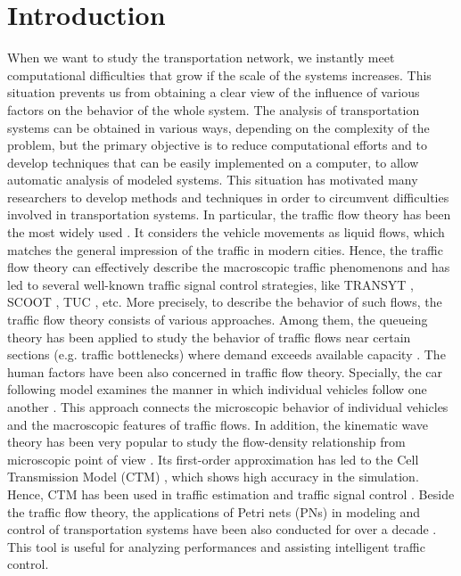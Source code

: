 \documentclass[trsc,nonblindrev]{informs3} %
\begin{document}

\section{Introduction}

When we want to study the transportation network, we instantly meet
computational difficulties that grow if the scale of the systems
increases. This situation prevents us from obtaining a clear view of
the influence of various factors on the behavior of the whole system.
The analysis of transportation systems can be obtained in various
ways, depending on the complexity of the problem, but the primary
objective is to reduce computational efforts and to develop
techniques that can be easily implemented on a computer, to allow
automatic analysis of modeled systems. This situation has motivated
many researchers to develop methods and techniques in order to
circumvent difficulties involved in transportation systems. In
particular, the traffic flow theory has been the most widely used
\citep{nathan_h_gartner_revised_2005}. It considers the vehicle
movements as liquid flows, which matches the general impression of
the traffic in modern cities. Hence, the traffic flow theory can
effectively describe the macroscopic traffic phenomenons and has led
to several well-known traffic signal control strategies, like TRANSYT
\citep{hale_traffic_2005}, SCOOT \citep{bretherton_r_d_scoot_1982},
TUC \citep{diakaki_multivariable_2002,papageorgiou_review_2003}, etc.
More precisely, to describe the behavior of such flows, the traffic
flow theory consists of various approaches. Among them, the queueing
theory has been applied to study the behavior of traffic flows near
certain sections (e.g. traffic bottlenecks) where demand exceeds
available capacity \citep{Vandaele2000}. The human factors have been
also concerned in traffic flow theory. Specially, the car following
model examines the manner in which individual vehicles follow one
another \citep{Gipps1981,Zhao2005}. This approach connects the
microscopic behavior of individual vehicles and the macroscopic
features of traffic flows. In addition, the kinematic wave theory has
been very popular to study the flow-density relationship from
microscopic point of view
\citep{zhang_kinematic_2002,jin_multicommodity_2004}. Its first-order
approximation has led to the Cell Transmission Model (CTM)
\citep{daganzo_cell_1995}, which shows high accuracy in the
simulation. Hence, CTM has been used in traffic estimation
\citep{CanudasdeWit2012} and traffic signal control
\citep{Pohlmann2010}. Beside the traffic flow theory, the
applications of Petri nets (PNs) in modeling and control of
transportation systems have been also conducted for over a decade
\citep{ng_review_2013}. This tool is useful for analyzing
performances and assisting intelligent traffic control.
\end{document}
